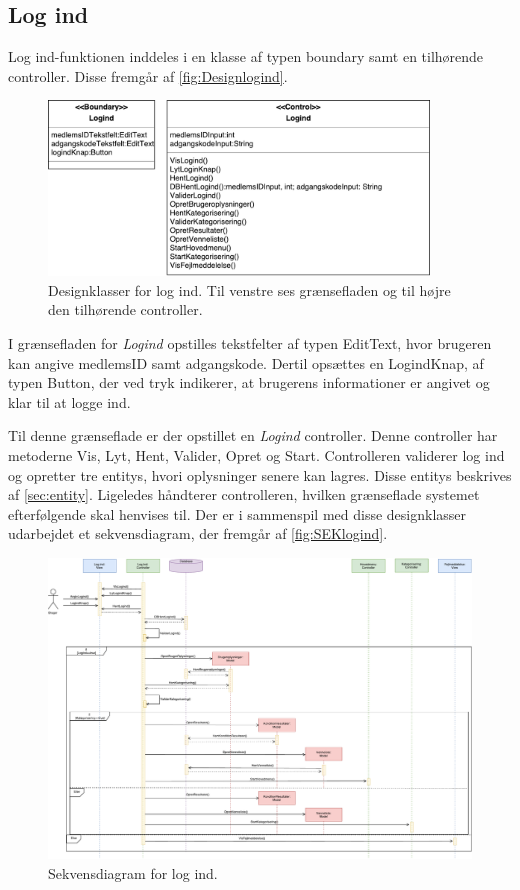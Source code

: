 \subsection*{Log ind}
Log ind-funktionen inddeles i en klasse af typen boundary samt en tilhørende controller. Disse fremgår af \autoref{fig:Designlogind}. 

\begin{figure} [H]
\centering
\includegraphics[width=0.9\textwidth]{figures/MVC/MVCLogInd}
\caption{Designklasser for log ind. Til venstre ses grænsefladen og til højre den tilhørende controller.}
\label{fig:Designlogind}
\end{figure}

\noindent
I grænsefladen for \textit{Logind} opstilles tekstfelter af typen EditText, hvor brugeren kan angive medlemsID samt adgangskode. Dertil opsættes en LogindKnap, af typen Button, der ved tryk indikerer, at brugerens informationer er angivet og klar til at logge ind. 

Til denne grænseflade er der opstillet en \textit{Logind} controller. Denne controller har metoderne Vis, Lyt, Hent, Valider, Opret og Start. Controlleren validerer log ind og opretter tre entitys, hvori oplysninger senere kan lagres. Disse entitys beskrives af \autoref{sec:entity}. Ligeledes håndterer controlleren, hvilken grænseflade systemet efterfølgende skal henvises til. Der er i sammenspil med disse designklasser udarbejdet et sekvensdiagram, der fremgår af \autoref{fig:SEKlogind}.

\begin{figure} [H]
\centering
\includegraphics[width=1.55\textwidth, angle=90]{figures/Sek/SEKLogInd}
\caption{Sekvensdiagram for log ind.}
\label{fig:SEKlogind}
\end{figure}

